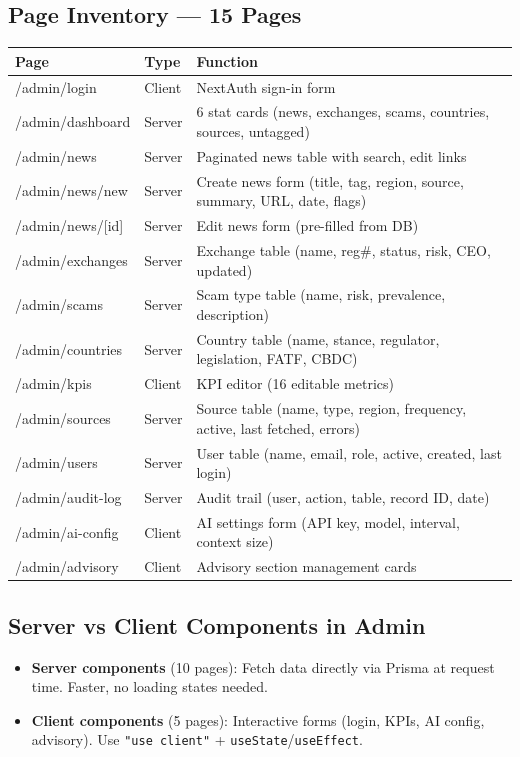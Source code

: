 \documentclass[12pt,a4paper]{article}
\begin{document}
\subsection{Page Inventory — 15 Pages}

\begin{center}
\begin{tabular}{llp{6cm}}
\toprule
\textbf{Page} & \textbf{Type} & \textbf{Function} \\
\midrule
/admin/login & Client & NextAuth sign-in form \\
/admin/dashboard & Server & 6 stat cards (news, exchanges, scams, countries, sources, untagged) \\
/admin/news & Server & Paginated news table with search, edit links \\
/admin/news/new & Server & Create news form (title, tag, region, source, summary, URL, date, flags) \\
/admin/news/[id] & Server & Edit news form (pre-filled from DB) \\
/admin/exchanges & Server & Exchange table (name, reg\#, status, risk, CEO, updated) \\
/admin/scams & Server & Scam type table (name, risk, prevalence, description) \\
/admin/countries & Server & Country table (name, stance, regulator, legislation, FATF, CBDC) \\
/admin/kpis & Client & KPI editor (16 editable metrics) \\
/admin/sources & Server & Source table (name, type, region, frequency, active, last fetched, errors) \\
/admin/users & Server & User table (name, email, role, active, created, last login) \\
/admin/audit-log & Server & Audit trail (user, action, table, record ID, date) \\
/admin/ai-config & Client & AI settings form (API key, model, interval, context size) \\
/admin/advisory & Client & Advisory section management cards \\
\bottomrule
\end{tabular}
\end{center}

\subsection{Server vs Client Components in Admin}

\begin{itemize}[nosep]
    \item \textbf{Server components} (10 pages): Fetch data directly via Prisma at request time. Faster, no loading states needed.
    \item \textbf{Client components} (5 pages): Interactive forms (login, KPIs, AI config, advisory). Use \texttt{"use client"} + \texttt{useState}/\texttt{useEffect}.
\end{itemize}
\end{document}
